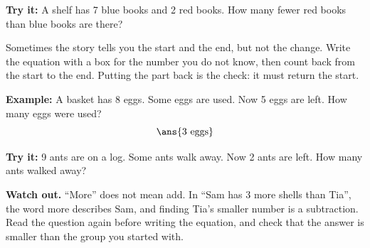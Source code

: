 \documentclass[12pt]{article}
\begin{document}
\begin{tryitbox}
\textbf{Try it:} A shelf has 7 blue books and 2 red books. How many fewer red
books than blue books are there?

\end{tryitbox}


\begin{formulabox}
Sometimes the story tells you the start and the end, but not the change. Write
the equation with a box for the number you do not know, then count back from the
start to the end. Putting the part back is the check: it must return the start.
\end{formulabox}

\begin{examplebox}
\textbf{Example:} A basket has 8 eggs. Some eggs are used. Now 5 eggs are left.
How many eggs were used?
\[ \ans{3 \text{ eggs}} \]
\end{examplebox}

\begin{tryitbox}
\textbf{Try it:} 9 ants are on a log. Some ants walk away. Now 2 ants are left.
How many ants walked away?

\end{tryitbox}

\begin{watchoutbox}
\textbf{Watch out.} ``More'' does not mean add. In ``Sam has 3 more shells than
Tia'', the word more describes Sam, and finding Tia's smaller number is a
subtraction. Read the question again before writing the equation, and check that
the answer is smaller than the group you started with.
\end{watchoutbox}
\end{document}
